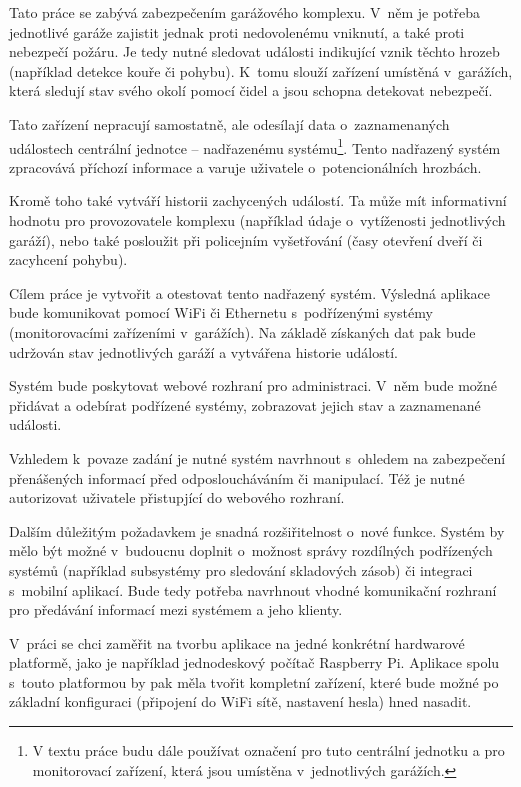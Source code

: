 Tato práce se zabývá zabezpečením garážového komplexu. V~něm je potřeba jednotlivé garáže zajistit jednak proti nedovolenému vniknutí, a také proti nebezpečí požáru. Je tedy nutné sledovat události indikující vznik těchto hrozeb (například detekce kouře či pohybu). K~tomu slouží zařízení umístěná v~garážích, která sledují stav svého okolí pomocí čidel a jsou schopna detekovat nebezpečí. 

Tato zařízení nepracují samostatně, ale odesílají data o~zaznamenaných událostech centrální jednotce -- nadřazenému systému\footnote{V textu práce budu dále používat označení  pro tuto centrální jednotku a  pro monitorovací zařízení, která jsou umístěna v~jednotlivých garážích.}. Tento nadřazený systém zpracovává příchozí informace a varuje uživatele o~potencionálních hrozbách.

Kromě toho také vytváří historii zachycených událostí. Ta může mít informativní hodnotu pro provozovatele komplexu (například údaje o~vytíženosti jednotlivých garáží), nebo také posloužit při policejním vyšetřování (časy otevření dveří či zacyhcení pohybu).

Cílem práce je vytvořit a otestovat tento nadřazený systém. Výsledná aplikace bude komunikovat pomocí WiFi či Ethernetu s~podřízenými systémy (monitorovacími zařízeními v~garážích). Na základě získaných dat pak bude udržován stav jednotlivých garáží a vytvářena historie událostí.

Systém bude poskytovat webové rozhraní pro administraci. V~něm bude možné přidávat a odebírat podřízené systémy, zobrazovat jejich stav a zaznamenané události.

Vzhledem k~povaze zadání je nutné systém navrhnout s~ohledem na zabezpečení přenášených informací před odposloucháváním či manipulací. Též je nutné autorizovat uživatele přistupjící do webového rozhraní.

Dalším důležitým požadavkem je snadná rozšiřitelnost o~nové funkce. Systém by mělo být možné v~budoucnu doplnit o~možnost správy rozdílných podřízených systémů (například subsystémy pro sledování skladových zásob) či integraci s~mobilní aplikací. Bude tedy potřeba navrhnout vhodné komunikační rozhraní pro předávání informací mezi systémem a jeho klienty. 

V~práci se chci zaměřit na tvorbu aplikace na jedné konkrétní hardwarové platformě, jako je například jednodeskový počítač Raspberry Pi. Aplikace spolu s~touto platformou by pak měla tvořit kompletní zařízení, které bude možné po základní konfiguraci (připojení do WiFi sítě, nastavení hesla) hned nasadit.

